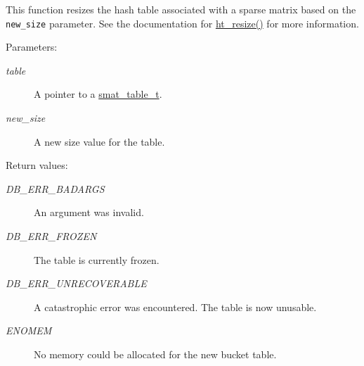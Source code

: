 This function resizes the hash table associated with a sparse matrix based on the {\tt new\_\-size} parameter. See the documentation for \hyperlink{group__dbprim__hash_a13}{ht\_\-resize()} for more information.\begin{Desc}
\item[Parameters: ]\par
\begin{description}
\item[{\em 
table}]A pointer to a \hyperlink{group__dbprim__smat_a0}{smat\_\-table\_\-t}. \item[{\em 
new\_\-size}]A new size value for the table.\end{description}
\end{Desc}
\begin{Desc}
\item[Return values: ]\par
\begin{description}
\item[{\em 
DB\_\-ERR\_\-BADARGS}]An argument was invalid. \item[{\em 
DB\_\-ERR\_\-FROZEN}]The table is currently frozen. \item[{\em 
DB\_\-ERR\_\-UNRECOVERABLE}]A catastrophic error was encountered. The table is now unusable. \item[{\em 
ENOMEM}]No memory could be allocated for the new bucket table. \end{description}
\end{Desc}
